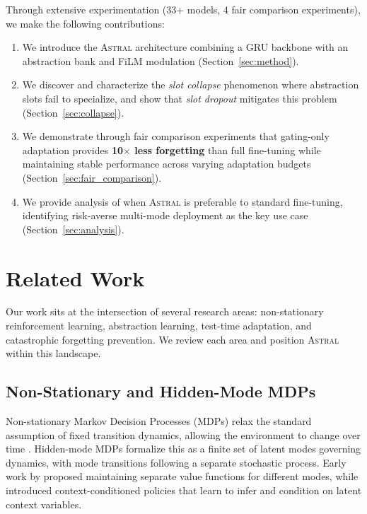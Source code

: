 \documentclass{article}
\newcommand{\astral}{\textsc{Astral}}
\newcommand{\method}{\astral}
\begin{document}
Through extensive experimentation (33+ models, 4 fair comparison experiments), we make the following contributions:

\begin{enumerate}
    \item We introduce the \method{} architecture combining a GRU backbone with an abstraction bank and FiLM modulation (Section~\ref{sec:method}).
    \item We discover and characterize the \emph{slot collapse} phenomenon where abstraction slots fail to specialize, and show that \emph{slot dropout} mitigates this problem (Section~\ref{sec:collapse}).
    \item We demonstrate through fair comparison experiments that gating-only adaptation provides \textbf{10$\times$ less forgetting} than full fine-tuning while maintaining stable performance across varying adaptation budgets (Section~\ref{sec:fair_comparison}).
    \item We provide analysis of when \method{} is preferable to standard fine-tuning, identifying risk-averse multi-mode deployment as the key use case (Section~\ref{sec:analysis}).
\end{enumerate}

\section{Related Work}
\label{sec:related}

Our work sits at the intersection of several research areas: non-stationary reinforcement learning, abstraction learning, test-time adaptation, and catastrophic forgetting prevention. We review each area and position \method{} within this landscape.

\subsection{Non-Stationary and Hidden-Mode MDPs}

Non-stationary Markov Decision Processes (MDPs) relax the standard assumption of fixed transition dynamics, allowing the environment to change over time \citep{padakandla2020survey}. Hidden-mode MDPs \citep{choi2000hidden} formalize this as a finite set of latent modes governing dynamics, with mode transitions following a separate stochastic process. Early work by \citet{da2006dealing} proposed maintaining separate value functions for different modes, while \citet{hallak2015contextual} introduced context-conditioned policies that learn to infer and condition on latent context variables.
\end{document}
